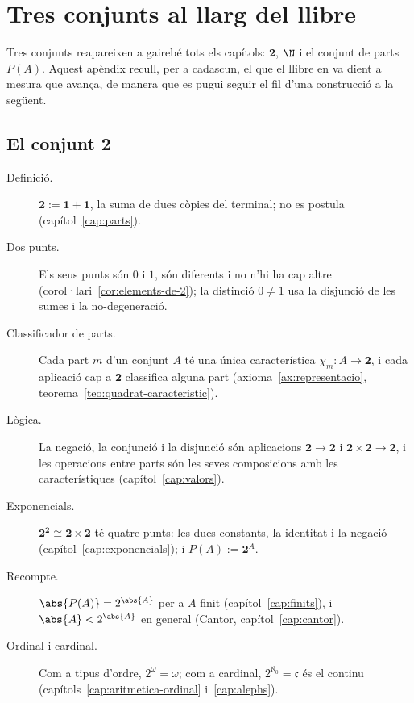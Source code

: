 \chapter{Tres conjunts al llarg del llibre}\label{cap:tres-conjunts}

Tres conjunts reapareixen a gairebé tots els capítols: \(\mathbf2\), \(\N\) i
el conjunt de parts \(P(A)\). Aquest apèndix recull, per a cadascun, el que
el llibre en va dient a mesura que avança, de manera que es pugui seguir el
fil d'una construcció a la següent.

\section*{\texorpdfstring{El conjunt \(\mathbf2\)}{El conjunt 2}}

\begin{description}
\item[Definició.] \(\mathbf2:=\mathbf1+\mathbf1\), la suma de dues còpies del
terminal; no es postula (capítol~\ref{cap:parts}).
\item[Dos punts.] Els seus punts són \(0\) i \(1\), són diferents i no n'hi ha
cap altre (corol·lari~\ref{cor:elements-de-2}); la distinció \(0\ne1\) usa la
disjunció de les sumes i la no-degeneració.
\item[Classificador de parts.] Cada part \(m\) d'un conjunt \(A\) té una única
característica \(\chi_m\colon A\to\mathbf2\), i cada aplicació cap a
\(\mathbf2\) classifica alguna part (axioma~\ref{ax:representacio},
teorema~\ref{teo:quadrat-caracteristic}).
\item[Lògica.] La negació, la conjunció i la disjunció són aplicacions
\(\mathbf2\to\mathbf2\) i \(\mathbf2\times\mathbf2\to\mathbf2\), i les operacions
entre parts són les seves composicions amb les característiques
(capítol~\ref{cap:valors}).
\item[Exponencials.] \(\mathbf2^{\mathbf2}\cong\mathbf2\times\mathbf2\) té quatre
punts: les dues constants, la identitat i la negació
(capítol~\ref{cap:exponencials}); i \(P(A):=\mathbf2^A\).
\item[Recompte.] \(\abs{P(A)}=2^{\abs{A}}\) per a \(A\) finit
(capítol~\ref{cap:finits}), i \(\abs{A}<2^{\abs{A}}\) en general (Cantor,
capítol~\ref{cap:cantor}).
\item[Ordinal i cardinal.] Com a tipus d'ordre, \(2^\omega=\omega\); com a
cardinal, \(2^{\aleph_0}=\mathfrak c\) és el continu
(capítols~\ref{cap:aritmetica-ordinal} i~\ref{cap:alephs}).
\end{description}

